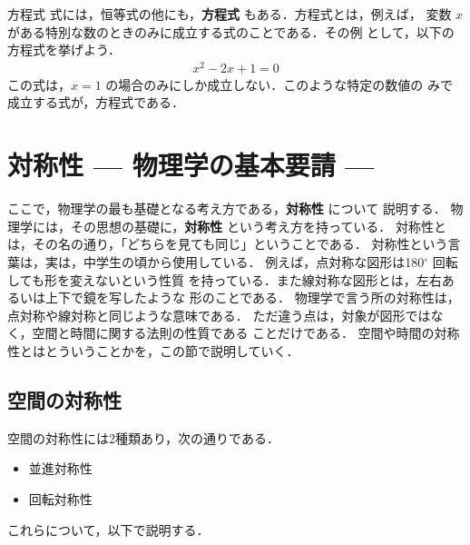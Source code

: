             \begin{memo}{方程式}
                式には，恒等式の他にも，\textbf{方程式} もある．方程式とは，例えば，
                変数 $x$ がある特別な数のときのみに成立する式のことである．その例
                として，以下の方程式を挙げよう．
                    \begin{align}
                        x^{2} - 2x + 1 = 0
                    \end{align}
                この式は，$x=1$ の場合のみにしか成立しない．このような特定の数値の
                みで成立する式が，方程式である．
            \end{memo}


    \section{対称性 --- 物理学の基本要請 ---}
    \begin{mycomment}
        ここで，物理学の最も基礎となる考え方である，\textbf{対称性} について
        説明する．
        物理学には，その思想の基礎に，\textbf{対称性} という考え方を持っている．
        対称性とは，その名の通り，「どちらを見ても同じ」ということである．
        対称性という言葉は，実は，中学生の頃から使用している．
        例えば，点対称な図形は180${}^{\circ}$ 回転しても形を変えないという性質
        を持っている．また線対称な図形とは，左右あるいは上下で鏡を写したような
        形のことである．
        物理学で言う所の対称性は，点対称や線対称と同じような意味である．
        ただ違う点は，対象が図形ではなく，空間と時間に関する法則の性質である
        ことだけである．
        空間や時間の対称性とはとういうことかを，この節で説明していく．
    \end{mycomment}

        \subsection{空間の対称性}
            \begin{mycomment}
                空間の対称性には2種類あり，次の通りである．
                    \begin{itemize}
                        \item 並進対称性
                        \item 回転対称性
                    \end{itemize}
                これらについて，以下で説明する．
            \end{mycomment}
